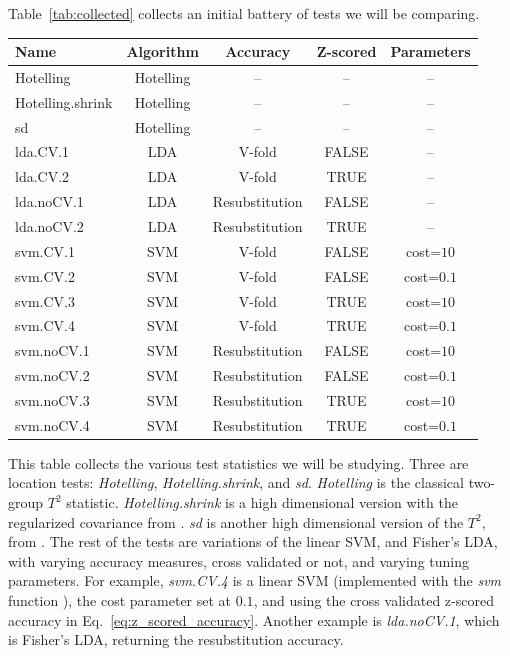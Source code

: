 \documentclass[12pt,a4paper]{article}
\begin{document}
\bigskip

Table~\ref{tab:collected} collects an initial battery of tests we will be comparing. 
\begin{tcolorbox}
\centering
\begin{tabular}{l|c|c|c|c}
Name & Algorithm & Accuracy & Z-scored & Parameters\\ 
\hline
\hline
Hotelling & Hotelling & -- & -- & -- \\ 
Hotelling.shrink & Hotelling & -- & -- & -- \\ 
sd & Hotelling & -- & -- & -- \\ 
lda.CV.1 	& LDA & V-fold 			& FALSE 	&  -- \\ 
lda.CV.2 	& LDA & V-fold 			& TRUE 	& -- \\ 
lda.noCV.1 	& LDA & Resubstitution 	& FALSE 	&  --\\ 
lda.noCV.2 	& LDA & Resubstitution 	& TRUE 	&  --\\ 
svm.CV.1 	& SVM & V-fold 			& FALSE & cost=$10$ \\ 
svm.CV.2 	& SVM & V-fold 			& FALSE & cost=$0.1$ \\ 
svm.CV.3 	& SVM & V-fold 			& TRUE 	& cost=$10$ \\ 
svm.CV.4 	& SVM & V-fold 			& TRUE 	& cost=$0.1$ \\ 
svm.noCV.1 	& SVM & Resubstitution 	& FALSE & cost=$10$ \\ 
svm.noCV.2 	& SVM & Resubstitution 	& FALSE & cost=$0.1$ \\ 
svm.noCV.3 	& SVM & Resubstitution 	& TRUE 	& cost=$10$ \\ 
svm.noCV.4 	& SVM & Resubstitution 	& TRUE 	& cost=$0.1$ \\
\end{tabular} 
\captionsetup{type=table}
\caption{\footnotesize
This table collects the various test statistics we will be studying. 
Three are location tests: \emph{Hotelling}, \emph{Hotelling.shrink}, and \emph{sd}.
\textit{Hotelling} is the classical two-group $T^2$ statistic. 
\textit{Hotelling.shrink} is a high dimensional version with the regularized covariance from \citet{schafer_shrinkage_2005}. 
\textit{sd} is another high dimensional version of the $T^2$, from \citet{srivastava_two_2013}.
The rest of the tests are variations of the linear SVM, and Fisher's LDA, with varying accuracy measures, cross validated or not, and varying tuning parameters. 
For example, \textit{svm.CV.4} is a linear SVM (implemented with the \emph{svm} \R function \citep{meyer_e1071:_2015}),
the cost parameter set at $0.1$, and using the cross validated z-scored accuracy in Eq.~\ref{eq:z_scored_accuracy}.
Another example is \textit{lda.noCV.1}, which is Fisher's LDA, returning the resubstitution accuracy.}
\label{tab:collected}
\end{tcolorbox}
\end{document}

